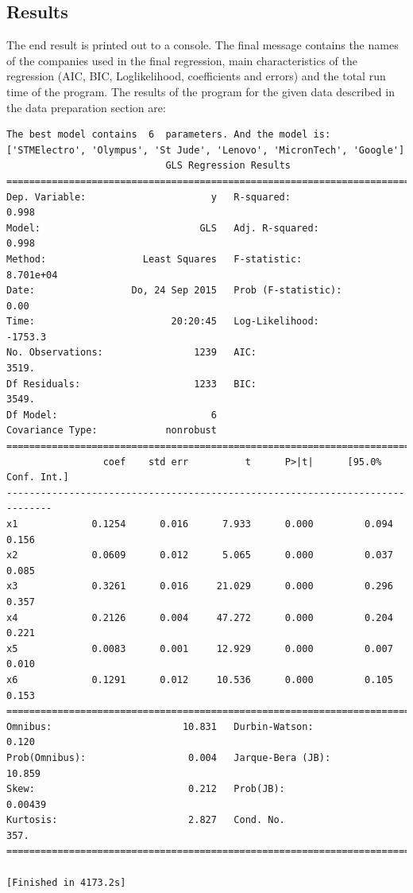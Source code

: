 \documentclass[
  twoside,
  12pt, a4paper,
  footinclude=true,
  headinclude=true,
  cleardoublepage=empty
]{article}
\begin{document}
\subsection{Results}
The end result is printed out to a console. The final message contains the names of the companies used in the final regression, main characteristics of the regression (AIC, BIC, Loglikelihood, coefficients and errors) and the total run time of the program. 
The results of the program for the given data described in the data preparation section are:
\begin{verbatim}
The best model contains  6  parameters. And the model is:
['STMElectro', 'Olympus', 'St Jude', 'Lenovo', 'MicronTech', 'Google']
                            GLS Regression Results                            
==============================================================================
Dep. Variable:                      y   R-squared:                       0.998
Model:                            GLS   Adj. R-squared:                  0.998
Method:                 Least Squares   F-statistic:                 8.701e+04
Date:                 Do, 24 Sep 2015   Prob (F-statistic):               0.00
Time:                        20:20:45   Log-Likelihood:                -1753.3
No. Observations:                1239   AIC:                             3519.
Df Residuals:                    1233   BIC:                             3549.
Df Model:                           6                                         
Covariance Type:            nonrobust                                         
==============================================================================
                 coef    std err          t      P>|t|      [95.0% Conf. Int.]
------------------------------------------------------------------------------
x1             0.1254      0.016      7.933      0.000         0.094     0.156
x2             0.0609      0.012      5.065      0.000         0.037     0.085
x3             0.3261      0.016     21.029      0.000         0.296     0.357
x4             0.2126      0.004     47.272      0.000         0.204     0.221
x5             0.0083      0.001     12.929      0.000         0.007     0.010
x6             0.1291      0.012     10.536      0.000         0.105     0.153
==============================================================================
Omnibus:                       10.831   Durbin-Watson:                   0.120
Prob(Omnibus):                  0.004   Jarque-Bera (JB):               10.859
Skew:                           0.212   Prob(JB):                      0.00439
Kurtosis:                       2.827   Cond. No.                         357.
==============================================================================

[Finished in 4173.2s]
\end{verbatim}
\end{document}
